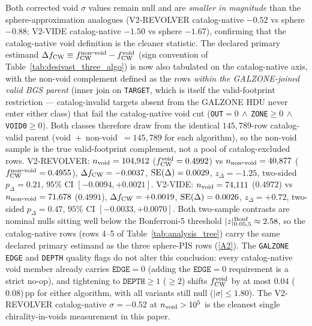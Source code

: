 \documentclass[aps,prd,twocolumn,superscriptaddress,showpacs,preprintnumbers,nofootinbib,longbibliography,floatfix]{revtex4-2}
\newcommand{\repoBase}{https://github.com/Hubify-Projects/bigbounce/blob/main}
\begin{document}
Both corrected void $\sigma$ values remain null and are
\emph{smaller in magnitude} than the sphere-approximation analogues
(V2-REVOLVER catalog-native $-0.52$ vs sphere $-0.88$; V2-VIDE
catalog-native $-1.50$ vs sphere $-1.67$), confirming that the
catalog-native void definition is the cleaner statistic.
The declared primary estimand $\Delta f_{\rm CW} \equiv
f_{\rm CW}^{\rm non\mbox{-}void} - f_{\rm CW}^{\rm void}$
(sign convention of Table~\ref{tab:desivast_three_algo}) is now also
tabulated on the catalog-native axis, with the non-void complement
defined as the rows \emph{within the GALZONE-joined valid BGS parent}
(inner join on \texttt{TARGET}, which is itself the valid-footprint
restriction --- catalog-invalid targets absent from the GALZONE HDU
never enter either class) that fail the catalog-native void cut
(\texttt{OUT}$=0\,\wedge\,$\texttt{ZONE}$\geq 0\,\wedge\,$%
\texttt{VOID0}$\geq 0$). Both classes therefore draw from the identical
$145{,}789$-row catalog-valid parent (void~$+$~non-void~$=145{,}789$ for
each algorithm), so the non-void sample is the true valid-footprint
complement, not a pool of catalog-excluded rows. V2-REVOLVER: $n_{\rm void} = 104{,}912$
($f_{\rm CW}^{\rm void} = 0.4992$) vs $n_{\rm non\mbox{-}void} =
40{,}877$ ($f_{\rm CW}^{\rm non\mbox{-}void} = 0.4955$),
$\Delta f_{\rm CW} = -0.0037$, ${\rm SE}(\Delta) = 0.0029$,
$z_\Delta = -1.25$, two-sided $p_\Delta = 0.21$, $95\%$ CI
$[-0.0094, +0.0021]$. V2-VIDE: $n_{\rm void} = 74{,}111$
($0.4972$) vs $n_{\rm non\mbox{-}void} = 71{,}678$ ($0.4991$),
$\Delta f_{\rm CW} = +0.0019$, ${\rm SE}(\Delta) = 0.0026$,
$z_\Delta = +0.72$, two-sided $p_\Delta = 0.47$, $95\%$ CI
$[-0.0033, +0.0070]$. Both two-sample contrasts are nominal nulls
sitting well below the Bonferroni-5 threshold
$|z|^{\rm Bonf}_{0.05,5} \approx 2.58$, so the catalog-native rows
(rows 4--5 of Table~\ref{tab:analysis_tree}) carry the same
declared primary estimand as the three sphere-PIS rows
(\href{\repoBase/pipelines/p5\_desi\_chirality/outputs/30\_ext4\_galzone\_complement\_contrasts.json}{[A2]}). The
\texttt{GALZONE} \texttt{EDGE} and \texttt{DEPTH} quality flags do not
alter this conclusion: every catalog-native void member already
carries $\texttt{EDGE} = 0$ (adding the $\texttt{EDGE} = 0$
requirement is a strict no-op), and tightening to
$\texttt{DEPTH} \geq 1$ ($\geq 2$) shifts $f_{\rm CW}^{\rm void}$ by
at most $0.04$ ($0.08$)\,pp for either algorithm, with all variants
still null ($|\sigma| \leq 1.80$). The V2-REVOLVER
catalog-native $\sigma = -0.52$ at $n_{\rm void} > 10^{5}$ is the
cleanest single chirality-in-voids measurement in this paper.
\end{document}
